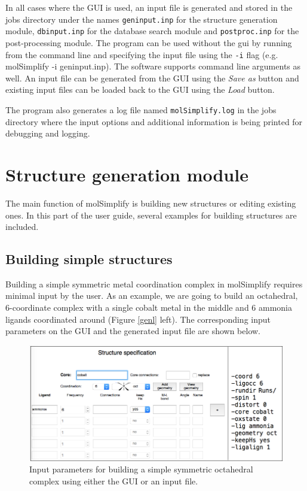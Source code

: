 \documentclass[a4paper,12pt]{assignment}
\begin{document}
In all cases where the GUI is used, an input file is generated and stored in the jobs directory under the names \texttt{geninput.inp} for the structure generation module, \texttt{dbinput.inp} for the database search module and \texttt{postproc.inp} for the post-processing module. The program can be used without the gui by running from the command line and specifying the input file using the \texttt{-i} flag (e.g. molSimplify -i geninput.inp). The software supports command line arguments as well. An input file can be generated from the GUI using the \textit{Save as} button and existing input files can be loaded back to the GUI using the \textit{Load} button.

The program also generates a log file named \texttt{molSimplify.log} in the jobs  directory where the input options and additional information is being printed for debugging and logging.

\section{Structure generation module}
The main function of molSimplify is building new structures or editing existing ones. In this part of the user guide, several examples for building structures are included. 

\subsection{Building simple structures}\label{simpgen}

Building a simple symmetric metal coordination complex in molSimplify requires minimal input by the user. As an example, we are going to build an octahedral, 6-coordinate complex with a single cobalt metal in the middle and 6 ammonia ligands coordinated around (Figure \ref{genl} left). The corresponding input parameters on the GUI and the generated input file are shown below.

\begin{figure}[htb!]
\centering
\includegraphics[width=\textwidth]{./Figures/fig1.png}
\caption{Input parameters for building a simple symmetric octahedral complex using either the GUI or an input file.}
\label{GUIov}
\end{figure}
\end{document}
